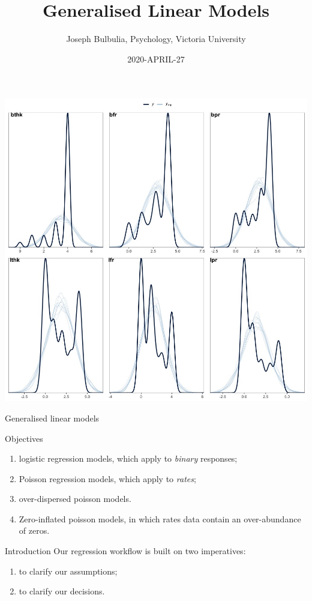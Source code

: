 \documentclass[
  ignorenonframetext,
]{beamer}
\title{Generalised Linear Models}
\author{Joseph Bulbulia, Psychology, Victoria University}
\date{2020-APRIL-27}
\providecommand{\tightlist}{%
  \setlength{\itemsep}{0pt}\setlength{\parskip}{0pt}}
\begin{document}
\frame{\titlepage}

\begin{frame}[fragile]
\includegraphics[width=13.89in]{op}

\begin{block}{Generalised linear models}
\protect\hypertarget{generalised-linear-models}{}
\end{block}

\begin{block}{Objectives}
\protect\hypertarget{objectives}{}
\begin{enumerate}[<+->]
\tightlist
\item
  logistic regression models, which apply to \emph{binary} responses;
\item
  Poisson regression models, which apply to \emph{rates};
\item
  over-dispersed poisson models.
\item
  Zero-inflated poisson models, in which rates data contain an
  over-abundance of zeros.
\end{enumerate}
\end{block}

\begin{block}{Introduction}
\protect\hypertarget{introduction}{}
Our regression workflow is built on two imperatives:

\begin{enumerate}[<+->]
[(1)]
\tightlist
\item
  to clarify our assumptions;
\item
  to clarify our decisions.
\end{enumerate}
\end{block}


\end{frame}
\end{document}
